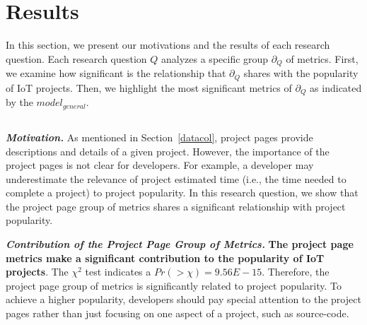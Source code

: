\section{Results}\label{section:results}
\begin{comment}
\end{comment}

In this section, we present our motivations and the results of each research
question. Each research question $Q$ analyzes a specific group $\partial_Q$ of
metrics. First, we examine how significant is the relationship that
$\partial_Q$ shares with the popularity of IoT projects.  Then, we highlight
the most significant metrics of $\partial_Q$ as indicated by the
$model_{general}$.

\subsection*{\bfseries\RQone}

\vspace{0.1cm}

\noindent\textbf{\textit{Motivation.}}
As mentioned in Section~\ref{datacol}, project pages provide descriptions and
details of a given project. However, the importance of the project pages is not
clear for developers. For example, a developer may underestimate the relevance
of project estimated time (i.e., the time needed to complete a project) to
project popularity. In this research question, we show that the project page
group of metrics shares a significant relationship with project popularity.

\vspace{0.1cm}



 

% 

\noindent\textbf{\textit{Contribution of the Project Page Group of Metrics.}}
\textbf{The project page metrics make a significant contribution to the
popularity of IoT projects}. The $\chi^2$ test indicates a
$Pr(>\chi)=9.56E-15$.  Therefore, the project page group of metrics is
significantly related to project popularity. To achieve a higher popularity,
developers should pay special attention to the project pages rather than just
focusing on one aspect of a project, such as source-code.

\vspace{0.1cm}

